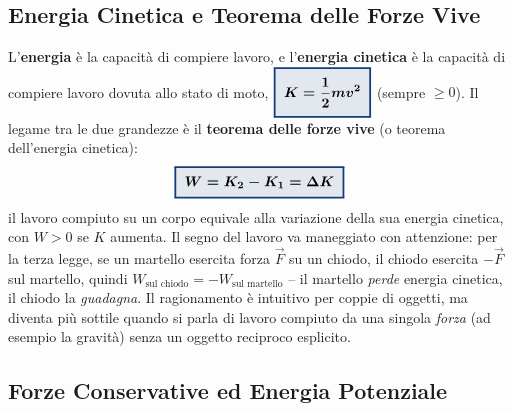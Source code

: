 \documentclass[a4paper,11pt]{article}
\newcommand{\keyeq}[1]{{\setlength{\fboxsep}{6pt}\setlength{\fboxrule}{1.3pt}\fcolorbox{chapblue}{chapblue!12}{\boldmath$\displaystyle #1$}}}
\begin{document}
\begin{center}
\end{center}

\subsection{Energia Cinetica e Teorema delle Forze Vive}

L'\textbf{energia} è la capacità di compiere lavoro, e l'\textbf{energia cinetica} è la capacità di compiere lavoro dovuta allo stato di moto, $\keyeq{K=\frac12mv^2}$ (sempre $\geq0$). Il legame tra le due grandezze è il \textbf{teorema delle forze vive} (o teorema dell'energia cinetica):
\[
\keyeq{W = K_2 - K_1 = \Delta K}
\]
il lavoro compiuto su un corpo equivale alla variazione della sua energia cinetica, con $W>0$ se $K$ aumenta. Il segno del lavoro va maneggiato con attenzione: per la terza legge, se un martello esercita forza $\vec F$ su un chiodo, il chiodo esercita $-\vec F$ sul martello, quindi $W_{\text{sul chiodo}}=-W_{\text{sul martello}}$ -- il martello \emph{perde} energia cinetica, il chiodo la \emph{guadagna}. Il ragionamento è intuitivo per coppie di oggetti, ma diventa più sottile quando si parla di lavoro compiuto da una singola \emph{forza} (ad esempio la gravità) senza un oggetto reciproco esplicito.

\subsection{Forze Conservative ed Energia Potenziale}
\end{document}
